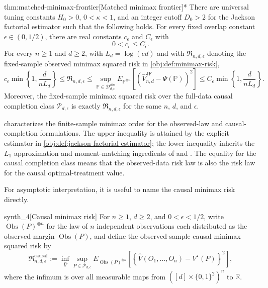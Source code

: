 \begin{theoremv}{thm:matched-minimax-frontier}[Matched minimax frontier]*
There are universal tuning constants \(H_0>0\), \(0<\kappa<1\), and an integer cutoff \(D_0>2\) for the Jackson factorial estimator such that the following holds.  For every fixed overlap constant \(\epsilon\in(0,1/2)\), there are real constants \(c_\epsilon\) and \(C_\epsilon\) with
\[
0<c_\epsilon\leq C_\epsilon .
\]
For every \(n\geq 1\) and \(d\geq 2\), with \(L_d=\log(ed)\) and with \(\mathfrak R_{n,d,\epsilon}\) denoting the fixed-sample observed minimax squared risk in \cref{obj:def:minimax-risk},
\[
c_\epsilon \min\left\{1,\frac{d}{nL_d}\right\}
\leq
\mathfrak R_{n,d,\epsilon}
\leq
\sup_{\mathbb P\in\mathcal D_{d,\epsilon}^{\mathrm{obs}}}
E_{\mathbb P^{\otimes n}}\!\left[
  \left(\widehat V_{n,d}^{\mathrm{JF}}-\Psi(\mathbb P)\right)^2
\right]
\leq
C_\epsilon \min\left\{1,\frac{d}{nL_d}\right\}.
\]
Moreover, the fixed-sample minimax squared risk over the full-data causal completion class \(\mathcal P_{d,\epsilon}\) is exactly \(\mathfrak R_{n,d,\epsilon}\) for the same \(n\), \(d\), and \(\epsilon\).
\end{theoremv}

 characterizes the finite-sample minimax order for the observed-law and causal-completion formulations. The upper inequality is attained by the explicit estimator in \cref{obj:def:jackson-factorial-estimator}; the lower inequality inherits the \(L_1\) approximation and moment-matching ingredients of \citet{CaiLow2011L1} and \citet{JiaoHanWeissman2018L1}. The equality for the causal completion class means that the observed-data risk law is also the risk law for the causal optimal-treatment value.

For asymptotic interpretation, it is useful to name the causal minimax risk directly.

\begin{definitionv}{synth_4}[Causal minimax risk]
For \(n\ge1\), \(d\ge2\), and \(0<\epsilon<1/2\), write \(\operatorname{Obs}(P)^{\otimes n}\) for the law of \(n\) independent observations each distributed as the observed margin \(\operatorname{Obs}(P)\), and define the observed-sample causal minimax squared risk by \[ \mathfrak R^{\mathrm{causal}}_{n,d,\epsilon}:=\inf_{\widehat V}\sup_{P\in\mathcal P_{d,\epsilon}} E_{\operatorname{Obs}(P)^{\otimes n}}\left[\left\{\widehat V(O_1,\ldots,O_n)-V^\star(P)\right\}^2\right], \] where the infimum is over all measurable maps from \(([d]\times\{0,1\}^2)^n\) to \(\mathbb R\).
\end{definitionv}

